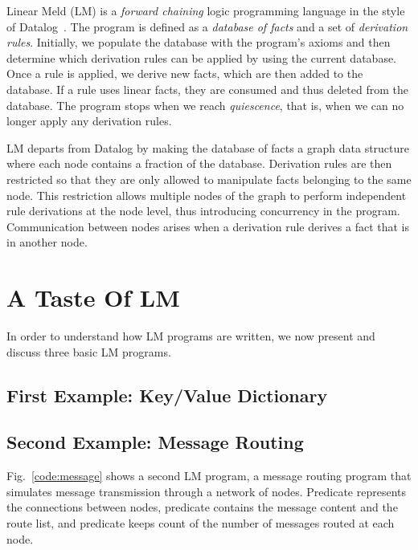 
Linear Meld (LM) is a \emph{forward chaining} logic programming language in the
style of Datalog~\cite{Ullman:1990:PDK:533142}. The program is defined as a
\emph{database of facts} and a set of \emph{derivation rules}.  Initially, we
populate the database with the program's axioms and then determine which
derivation rules can be applied by using the current database. Once a rule is
applied, we derive new facts, which are then added to the database.  If a rule
uses linear facts, they are consumed and thus deleted from the database.  The
program stops when we reach \emph{quiescence}, that is, when we can no longer
apply any derivation rules.

LM departs from Datalog by making the database of facts a graph data structure
where each node contains a fraction of the database. Derivation rules are then
restricted so that they are only allowed to manipulate facts belonging to the
same node. This restriction allows multiple nodes of the graph to perform
independent rule derivations at the node level, thus introducing concurrency in
the program. Communication between nodes arises when a derivation rule derives a
fact that is in another node.

\section{A Taste Of LM}

In order to understand how LM programs are written, we now present and discuss
three basic LM programs.

\subsection{First Example: Key/Value Dictionary}\label{sec:language:key_value}


\subsection{Second Example: Message Routing}

Fig.~\ref{code:message} shows a second LM program, a message routing program
that simulates message transmission through a network of nodes.  Predicate
 represents the connections between nodes, predicate
 contains the message content and the route list, and
predicate  keeps count of the number of messages routed at
each node.

